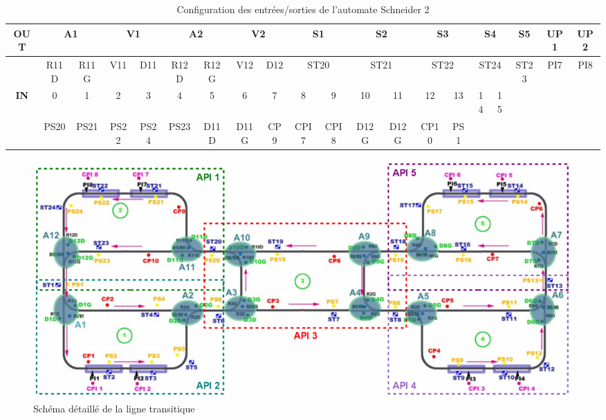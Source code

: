 \documentclass[a4paper,french, titlepage]{book}
\begin{document}
\begin{center}
{\begin{minipage}{1.5\linewidth}
\begin{table}[H]
	\begin{center}
		\begin{tabular}{|c|c|c|c|c|c|c|c|c|c|c|c|c|c|c|c|c|c|c|c|c|c|c|c|}
			\hline \multicolumn{2}{|c|}{\textbf{OUT}}  & \multicolumn{2}{|c|}{A1} & \multicolumn{2}{|c|}{V1} & \multicolumn{2}{|c|}{A2} & \multicolumn{2}{|c|}{V2} & \multicolumn{2}{|c|}{S1} & \multicolumn{2}{|c|}{S2} & \multicolumn{2}{|c|}{S3} & \multicolumn{2}{|c|}{S4} & \multicolumn{2}{|c|}{S5} & \multicolumn{2}{|c|}{UP1} & \multicolumn{2}{|c|}{UP2}  \\
			\hline \multicolumn{2}{|c|}{} & R11D & R11G & V11 & D11 & R12D & R12G & V12 & D12 & \multicolumn{2}{|c|}{ST20} & \multicolumn{2}{|c|}{ST21} & \multicolumn{2}{|c|}{ST22} & \multicolumn{2}{|c|}{ST24} & \multicolumn{2}{|c|}{ST23} & \multicolumn{2}{|c|}{PI7} & \multicolumn{2}{|c|}{PI8} \\
			\hline \multicolumn{2}{|c|}{\textbf{IN}} & 0 & 1 & 2 & 3 & 4 & 5 & 6 & 7 & 8 & 9 & 10 & 11 & 12 & 13 & 14 & 15 & & & & & & \\
			\hline \multicolumn{2}{|c|}{} & PS20 & PS21 & PS22 & PS24 & PS23 & D11D & D11G & CP9 & CPI7 & CPI8 & D12G & D12G & CP10 & PS1 & & & & & & & & \\
			\hline
		\end{tabular}      
	\end{center}
	\caption{\label{tab:ap2}Configuration des entrées/sorties de l'automate Schneider 2}
\end{table}
\end{minipage}
}%
\end{center}



\begin{figure}[H]
	     \begin{center}
	     \includegraphics[angle=90,scale=0.72]{Images/maquette.png} 
	     \end{center}
	     \caption{Schéma détaillé de la ligne transitique}
	     \label{Schema_detaille}
\end{figure}
\end{document}
